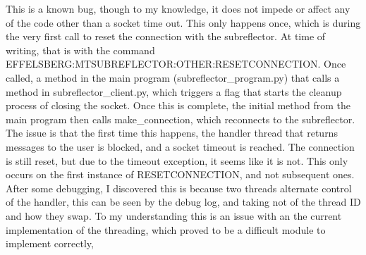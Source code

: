 \documentclass{article}
\begin{document}
This is a known bug, though to my knowledge, it does not impede or affect any of the code other than a socket time out. This only happens once, which is during the very first call to reset the connection with the subreflector. At time of writing, that is with the command EFFELSBERG:MTSUBREFLECTOR:OTHER:RESETCONNECTION. Once called, a method in the main program (subreflector\_program.py) that 
calls a method in subreflector\_client.py, which triggers a flag that starts the cleanup process of closing the socket. Once this is complete, the initial method from the main program then calls make\_connection, which reconnects to the subreflector. The issue is that the first time this happens, the handler thread that returns messages to the user is blocked, and a socket timeout is reached. The connection is still reset, but due to the timeout exception, it seems like it is not. This only occurs on the first instance of RESETCONNECTION, and not subsequent ones. After some debugging, I discovered this is because two threads alternate control of the handler, this can be seen by the debug log, and taking not of the thread ID and how they swap. To my understanding this is an issue with an the current implementation of the threading, which proved to be a difficult module to implement correctly,

\end{document}
